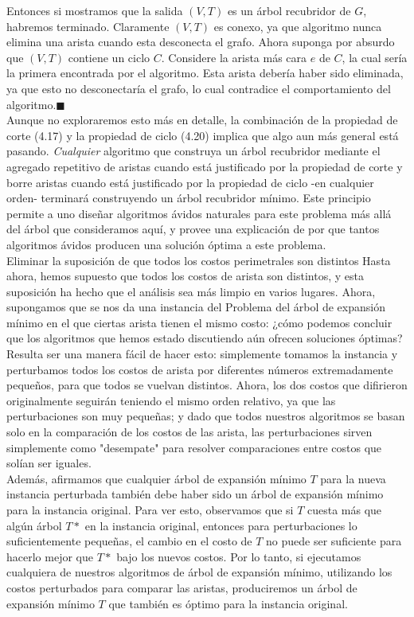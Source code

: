 \documentclass[a4paper]{article}
\begin{document}
Entonces si mostramos que la salida $(V,T)$ es un árbol recubridor de $G$, habremos terminado. Claramente $(V,T)$ es conexo, ya que algoritmo nunca elimina una arista cuando esta desconecta el grafo. Ahora suponga por absurdo que $(V,T)$ contiene un ciclo $C$. Considere la arista más cara $e$ de $C$, la cual sería la primera encontrada por el algoritmo. Esta arista debería haber sido eliminada, ya que esto no desconectaría el grafo, lo cual contradice el comportamiento del algoritmo.\(\blacksquare\)\\
    
Aunque no exploraremos esto más en detalle, la combinación de la propiedad de corte (4.17) y la propiedad de ciclo (4.20) implica que algo aun más general está pasando. \textit{Cualquier} algoritmo que construya un árbol recubridor mediante el agregado repetitivo de aristas cuando está justificado por la propiedad de corte y borre aristas cuando está justificado por la propiedad de ciclo -en cualquier orden- terminará construyendo un árbol recubridor mínimo. Este principio permite a uno diseñar algoritmos ávidos naturales para este problema más allá del árbol que consideramos aquí, y provee una explicación de por que tantos algoritmos ávidos producen una solución óptima a este problema.\\
    
Eliminar la suposición de que todos los costos perimetrales son distintos Hasta ahora, hemos supuesto que todos los costos de arista son distintos, y esta suposición ha hecho que el análisis sea más limpio en varios lugares. Ahora, supongamos que se nos da una instancia del Problema del árbol de expansión mínimo en el que ciertas arista tienen el mismo costo: ¿cómo podemos concluir que los algoritmos que hemos estado discutiendo aún ofrecen soluciones óptimas?\\

Resulta ser una manera fácil de hacer esto: simplemente tomamos la instancia y perturbamos todos los costos de arista por diferentes números extremadamente pequeños, para que todos se vuelvan distintos. Ahora, los dos costos que difirieron originalmente seguirán teniendo el mismo orden relativo, ya que las perturbaciones son muy pequeñas; y dado que todos nuestros algoritmos se basan solo en la comparación de los costos de las arista, las perturbaciones sirven simplemente como "desempate" para resolver comparaciones entre costos que solían ser iguales.\\

Además, afirmamos que cualquier árbol de expansión mínimo $T$ para la nueva instancia perturbada también debe haber sido un árbol de expansión mínimo para la instancia original. Para ver esto, observamos que si $T$ cuesta más que algún árbol $T*$ en la instancia original, entonces para perturbaciones lo suficientemente pequeñas, el cambio en el costo de $T$ no puede ser suficiente para hacerlo mejor que $T*$ bajo los nuevos costos. Por lo tanto, si ejecutamos cualquiera de nuestros algoritmos de árbol de expansión mínimo, utilizando los costos perturbados para comparar las aristas, produciremos un árbol de expansión mínimo $T$ que también es óptimo para la instancia original.\\  
% 
% 
\end{document}
